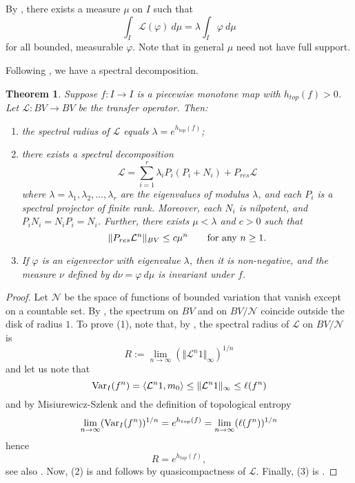 \documentclass[11pt]{amsart}
\newtheorem{theorem}{Theorem}[section]
\newcommand{\var}[2]{\textup{Var}_{#2}(#1)}
\begin{document}
By \cite[Chapter III.5]{HK2}, there exists a measure $\mu$ on $I$ 
such that 
$$\int_I \mathcal{L}(\varphi) \ d \mu =  \lambda \int_I \varphi \ d \mu$$
for all bounded, measurable $\varphi$. Note that in general $\mu$ need not have full support. 

Following \cite{Baladi-Keller}, we have a spectral decomposition. 

\begin{theorem} \label{T:sp-dec-II}
Suppose $f : I \to I$ is a piecewise monotone map with $h_{top}(f) > 0$.
Let $\mathcal{L} : BV \to BV$ be the transfer operator. Then: 
\begin{enumerate}
\item the spectral radius of $\mathcal{L}$ equals $\lambda = e^{h_{top}(f)}$; 
\item there exists a spectral decomposition 
$$\mathcal{L} = \sum_{i = 1}^r \lambda_i P_i ( P_i + N_i) + P_{res} \mathcal{L}$$
where $\lambda = \lambda_1, \lambda_2, \dots, \lambda_r$ are the eigenvalues of modulus $\lambda$, and each $P_i$ is a spectral projector of finite rank.
Moreover, each $N_i$ is nilpotent, and $P_i N_i = N_i P_i = N_i$.
Further, there exists $\mu < \lambda$ and $c > 0$ such that 
$$\Vert P_{res} \mathcal{L}^n \Vert_{BV} \leq c \mu^n \qquad \textup{for any }n \geq 1.$$ 
\item
If $\varphi$ is an eigenvector with eigenvalue $\lambda$, then it is non-negative, and the measure $\nu$ defined by $d \nu = \varphi \ d \mu$ is invariant under $f$. 
\end{enumerate}
\end{theorem}


\begin{proof}
Let $\mathcal{N}$ be the space of functions of bounded variation that vanish except on a countable set. 
By \cite[Proposition 3.4]{Baladi-book}, the spectrum on $BV$ and on $BV/\mathcal{N}$ coincide outside the disk of radius $1$. 
To prove (1), note that, by \cite[Theorem 3.2 (c)]{Baladi-book}, the spectral radius of $\mathcal{L}$ on $BV/\mathcal{N}$ is 
$$R := \lim_{n \to \infty} (\Vert \mathcal{L}^n 1 \Vert_\infty)^{1/n}$$
and let us note that 
$$\var{f^n}{I} = \langle \mathcal{L}^n 1, m_0 \rangle \leq \Vert \mathcal{L}^n 1 \Vert_\infty \leq \ell(f^n)$$
and by Misiurewicz-Szlenk \cite{MS} and the definition of topological entropy 
$$\lim_{n \to \infty} (\var{f^n}{I})^{1/n} = e^{h_{top}(f)} = \lim_{n \to \infty} (\ell(f^n))^{1/n}$$
hence 
$$R = e^{h_{top}(f)},$$
see also \cite[Theorem 3.3]{Baladi-book}.
Now, (2) is \cite[Theorem 1]{Baladi-Keller} and follows by quasicompactness of $\mathcal{L}$. 
Finally, (3) is \cite[Theorem 3.2 (c)]{Baladi-book}. 
\end{proof}
\end{document}

